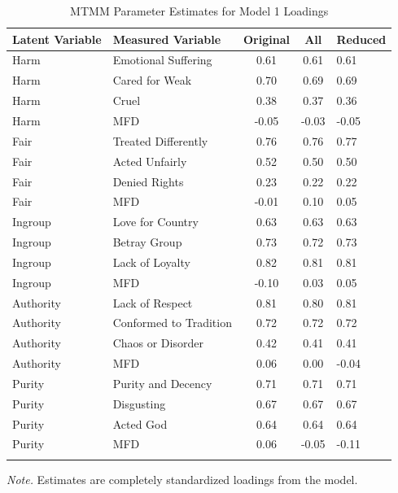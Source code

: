 \documentclass[
  man,floatsintext]{apa6}
\begin{document}
\begin{table}[ht]

\begin{center}
\begin{threeparttable}

\caption{\label{tab:mtmm-model1-table2}MTMM Parameter Estimates for Model 1 Loadings}

\footnotesize{

\begin{tabular}{llccl}
\toprule
Latent Variable & Measured Variable & Original & All & Reduced\\
\midrule
Harm & Emotional Suffering & 0.61 & 0.61 & 0.61\\
Harm & Cared for Weak & 0.70 & 0.69 & 0.69\\
Harm & Cruel & 0.38 & 0.37 & 0.36\\
Harm & MFD & -0.05 & -0.03 & -0.05\\
Fair & Treated Differently & 0.76 & 0.76 & 0.77\\
Fair & Acted Unfairly & 0.52 & 0.50 & 0.50\\
Fair & Denied Rights & 0.23 & 0.22 & 0.22\\
Fair & MFD & -0.01 & 0.10 & 0.05\\
Ingroup & Love for Country & 0.63 & 0.63 & 0.63\\
Ingroup & Betray Group & 0.73 & 0.72 & 0.73\\
Ingroup & Lack of Loyalty & 0.82 & 0.81 & 0.81\\
Ingroup & MFD & -0.10 & 0.03 & 0.05\\
Authority & Lack of Respect & 0.81 & 0.80 & 0.81\\
Authority & Conformed to Tradition & 0.72 & 0.72 & 0.72\\
Authority & Chaos or Disorder & 0.42 & 0.41 & 0.41\\
Authority & MFD & 0.06 & 0.00 & -0.04\\
Purity & Purity and Decency & 0.71 & 0.71 & 0.71\\
Purity & Disgusting & 0.67 & 0.67 & 0.67\\
Purity & Acted God & 0.64 & 0.64 & 0.64\\
Purity & MFD & 0.06 & -0.05 & -0.11\\
\bottomrule
\addlinespace
\end{tabular}

}

\begin{tablenotes}[para]
\normalsize{\textit{Note.} Estimates are completely standardized loadings from the model.}
\end{tablenotes}

\end{threeparttable}
\end{center}

\end{table}
\end{document}
